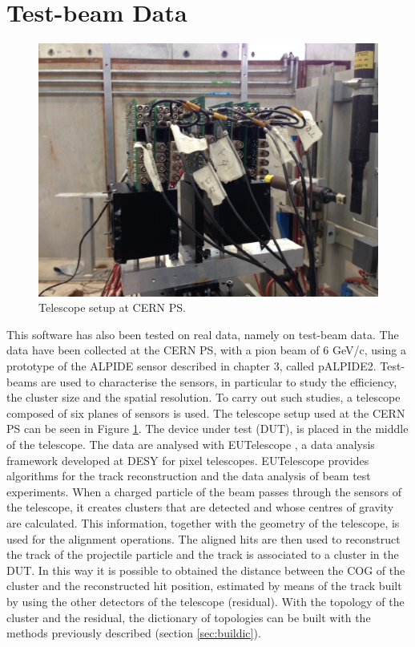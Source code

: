 \section{Test-beam Data}
%
\begin{figure}
  \centering
  \includegraphics[scale=0.22]{figures/telescope.png}
  \caption{Telescope setup at CERN PS.}
  \label{fig:telescope}
\end{figure}
%
This software has also been tested on real data, namely on test-beam data. The data have been collected at the CERN PS, with a pion beam of 6 GeV/c, using a prototype of the ALPIDE sensor described in chapter 3, called pALPIDE2. Test-beams are used to characterise the sensors, in particular to study the efficiency, the cluster size and the spatial resolution. To carry out such studies, a telescope composed of six planes of sensors is used. The telescope setup used at the CERN PS can be seen in Figure \ref{fig:telescope}. The device under test (DUT), is placed in the middle of the telescope. The data are analysed with EUTelescope \cite{eutelescope}, a data analysis framework developed at DESY for pixel telescopes. EUTelescope provides algorithms for the track reconstruction and the data analysis of beam test experiments. When a charged particle of the beam passes through the sensors of the telescope, it creates clusters that are detected and whose centres of gravity are calculated. This information, together with the geometry of the telescope, is used for the alignment operations. The aligned hits are then used to reconstruct the track of the projectile particle and the track is associated to a cluster in the DUT. In this way it is possible to obtained the distance between the COG of the cluster and the reconstructed hit position, estimated by means of the track built by using the other detectors of the telescope (residual). With the topology of the cluster and the residual, the dictionary of topologies can be built with the methods previously described (section \ref{sec:buildic}).\\
